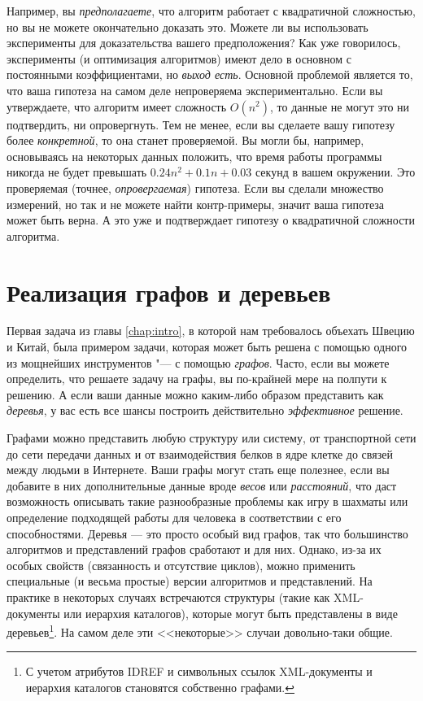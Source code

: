 Например, вы \textit{предполагаете}, что алгоритм работает с квадратичной сложностью, но вы не можете окончательно доказать это. Можете ли вы использовать эксперименты для доказательства вашего предположения? Как уже говорилось, эксперименты (и оптимизация алгоритмов) имеют дело в основном с постоянными коэффициентами, но \textit{выход есть}. Основной проблемой является то, что ваша гипотеза на самом деле непроверяема экспериментально. Если вы утверждаете, что алгоритм имеет сложность $O(n^2)$, то данные не могут это ни подтвердить, ни опровергнуть. Тем не менее, если вы сделаете вашу гипотезу более \textit{конкретной}, то она станет проверяемой. Вы могли бы, например, основываясь на некоторых данных положить, что время работы программы никогда не будет превышать $0.24n^2+0.1n+0.03$ секунд в вашем окружении. Это проверяемая (точнее, \textit{опровергаемая}) гипотеза. Если вы сделали множество измерений, но так и не можете найти контр-примеры, значит ваша гипотеза может быть верна. А это уже и подтверждает гипотезу о квадратичной сложности алгоритма.

\section{Реализация графов и деревьев }
\label{sec:implementing-graphs-and-trees}
Первая задача из главы \ref{chap:intro}, в которой нам требовалось объехать Швецию и Китай, была примером задачи, которая может быть решена с помощью одного из мощнейших инструментов "--- с помощью \textit{графов}. Часто, если вы можете определить, что решаете задачу на графы, вы по-крайней мере на полпути к решению. А если ваши данные можно каким-либо образом представить как \textit{деревья}, у вас есть все шансы построить действительно \textit{эффективное} решение.

Графами можно представить любую структуру или систему, от транспортной сети до сети передачи данных и от взаимодействия белков в ядре клетке до связей между людьми в Интернете.
Ваши графы могут стать еще полезнее, если вы добавите в них дополнительные данные вроде \textit{весов} или \textit{расстояний}, что даст возможность описывать такие разнообразные проблемы как игру в шахматы или определение подходящей работы для человека в соответствии с его способностями.
Деревья — это просто особый вид графов, так что большинство алгоритмов и представлений графов сработают и для них.
Однако, из-за их особых свойств (связанность и отсутствие циклов), можно применить специальные (и весьма простые) версии алгоритмов и представлений.
На практике в некоторых случаях встречаются структуры (такие как XML-документы или иерархия каталогов), которые могут быть представлены в виде деревьев\footnote{С учетом атрибутов IDREF и символьных ссылок XML-документы и иерархия каталогов становятся собственно графами.}. На самом деле эти <<некоторые>> случаи довольно-таки общие.

